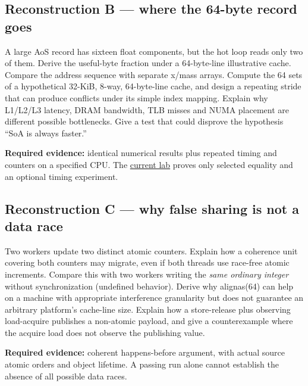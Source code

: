 \subsection{Reconstruction B --- where the 64-byte record goes}\label{appendix-2587680a4fe3-reconstruction-b-where-the-64-byte-record-goes}

\hypertarget{appendix-2587680a4fe3-reconstruction-b-where-the-64-byte-record-goes}{}

A large AoS record has sixteen float components, but the hot loop reads only two of them. Derive the useful-byte fraction under a 64-byte-line illustrative cache. Compare the address sequence with separate x/mass arrays. Compute the 64 sets of a hypothetical 32-KiB, 8-way, 64-byte-line cache, and design a repeating stride that can produce conflicts under its simple index mapping. Explain why L1/L2/L3 latency, DRAM bandwidth, TLB misses and NUMA placement are different possible bottlenecks. Give a test that could disprove the hypothesis ``SoA is always faster.''

\textbf{Required evidence:} identical numerical results plus repeated timing and counters on a specified CPU. The \hyperref[source-file-0060a91bd24dd25d6c14e679]{current lab} proves only selected equality and an optional timing experiment.

\subsection{Reconstruction C --- why false sharing is not a data race}\label{appendix-2587680a4fe3-reconstruction-c-why-false-sharing-is-not-a-data-race}

\hypertarget{appendix-2587680a4fe3-reconstruction-c-why-false-sharing-is-not-a-data-race}{}

Two workers update two distinct atomic counters. Explain how a coherence unit covering both counters may migrate, even if both threads use race-free atomic increments. Compare this with two workers writing the \emph{same ordinary integer} without synchronization (undefined behavior). Derive why alignas(64) can help on a machine with appropriate interference granularity but does not guarantee an arbitrary platform's cache-line size. Explain how a store-release plus observing load-acquire publishes a non-atomic payload, and give a counterexample where the acquire load does not observe the publishing value.

\textbf{Required evidence:} coherent happens-before argument, with actual source atomic orders and object lifetime. A passing run alone cannot establish the absence of all possible data races.

